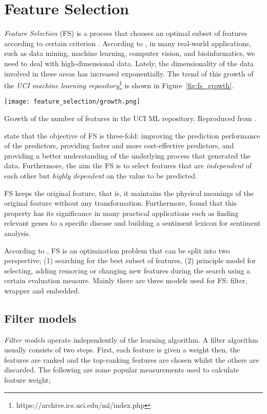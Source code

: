 \chapter{Feature Selection}
\label{ch:feature-selection}

\textit{Feature Selection} (FS) is a process that chooses an optimal subset of features according to certain criterion \citep{liu2012feature}. According to \citet{sammut2017encyclopedia}, in many real-world applications, such as data mining, machine learning, computer vision, and bioinformatics, we need to deal with high-dimensional data. Lately, the dimensionality of the data involved in these areas has increased exponentially. The trend of this growth of the \textit{UCI machine learning repository}\footnote{https://archive.ics.uci.edu/ml/index.php} is shown in Figure~\ref{fig:fs_growth}.

\begin{marginfigure}
  \texttt{[image: feature\_selection/growth.png]}
  \caption{Growth of the number of features in the UCI ML repository. Reproduced from \citet{sammut2017encyclopedia}.}
  \label{fig:fs_growth}
\end{marginfigure}

\citet{guyon2003introduction} state that the objective of FS is three-fold: improving the prediction performance of the predictors, providing faster and more cost-effective predictors, and providing a better understanding of the underlying process that generated the data. Furthermore, the aim the FS is to select features that are \textit{independent} of each other but \textit{highly dependent} on the value to be predicted.

FS keeps the original feature, that is, it maintains the physical meanings of the original feature without any transformation. Furthermore, \citet{masaeli2010transformation} found that this property has its significance in many practical applications such as finding relevant genes to a specific disease and building a sentiment lexicon for sentiment analysis.

According to \citet{zhao2010advancing}, FS is an optimization problem that can be split into two perspective; (1) searching for the best subset of features, (2) principle model for selecting, adding removing or changing new features during the search using a certain evaluation measure. Mainly there are three models used for FS: filter, wrapper and embedded.

\section{Filter models}\label{sec:fs_filter}
\textit{Filter models} operate independently of the learning algorithm. A filter algorithm usually consists of two steps. First, each feature is given a weight then, the features are ranked and the top-ranking features are chosen whilst the others are discarded. The following are some popular measurements used to calculate feature weight;

